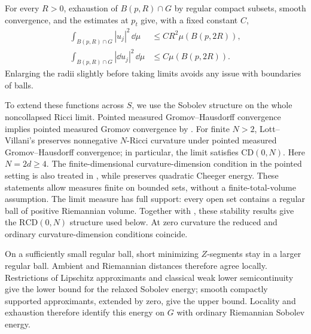 For every $R>0$, exhaustion of $B(p,R)\cap G$ by regular compact subsets,
smooth convergence, and the estimates at $p_t$ give, with a fixed
constant $C$,
\begin{align}
 \int_{B(p,R)\cap G}|u_j|^2\,\dd\mu
       &\le CR^2\mu(B(p,2R)),\label{eq:linear-L2}\\
 \int_{B(p,R)\cap G}|\dd u_j|^2\,\dd\mu
       &\le C\mu(B(p,2R)).\label{eq:finite-energy}
\end{align}
Enlarging the radii slightly before taking limits avoids any issue
with boundaries of balls.

To extend these functions across $S$, we use the Sobolev structure
on the whole noncollapsed Ricci limit. Pointed measured
Gromov--Hausdorff convergence implies pointed measured Gromov
convergence by \cite[Proposition~3.30]{GigliMondinoSavare}.
For finite $N>2$, Lott--Villani's \cite[Corollary~E.44]{LottVillani}
preserves nonnegative $N$-Ricci curvature under pointed measured
Gromov--Hausdorff convergence; in particular, the limit satisfies
$\mathrm{CD}(0,N)$. Here $N=2d\ge4$. The finite-dimensional curvature-dimension
condition in the pointed setting is also treated in
\cite[Section~4.2]{GigliMondinoSavare}, while
\cite[Theorem~7.2]{GigliMondinoSavare} preserves quadratic
Cheeger energy. These statements allow measures finite on bounded
sets, without a finite-total-volume assumption. The limit measure
has full support: every open set contains a regular
ball of positive Riemannian volume. Together with
\cite[Theorem~3.17(i)]{ErbarKuwadaSturm}, these stability results
give the $\mathrm{RCD}(0,N)$ structure used below. At zero curvature
the reduced and ordinary curvature-dimension conditions coincide.

On a sufficiently small regular ball, short minimizing $Z$-segments
stay in a larger regular ball. Ambient and Riemannian distances
therefore agree locally. Restrictions of Lipschitz
approximants and classical weak lower semicontinuity give the
lower bound for the relaxed Sobolev energy; smooth compactly
supported approximants, extended by zero, give the upper bound.
Locality and exhaustion therefore identify this energy on $G$
with ordinary Riemannian Sobolev energy.

